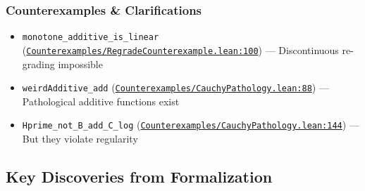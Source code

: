 \documentclass[11pt]{article}
\theoremstyle{definition}
\theoremstyle{remark}
\begin{document}
\subsubsection*{Counterexamples \& Clarifications}
\begin{itemize}
\item \texttt{monotone\_additive\_is\_linear} (\href{https://github.com/zariuq/ks-foundations-of-inference/blob/main/KnuthSkilling/Counterexamples/RegradeCounterexample.lean\#L100}{\texttt{Counterexamples/RegradeCounterexample.lean:100}}) --- Discontinuous re-grading impossible
\item \texttt{weirdAdditive\_add} (\href{https://github.com/zariuq/ks-foundations-of-inference/blob/main/KnuthSkilling/Counterexamples/CauchyPathology.lean\#L88}{\texttt{Counterexamples/CauchyPathology.lean:88}}) --- Pathological additive functions exist
\item \texttt{Hprime\_not\_B\_add\_C\_log} (\href{https://github.com/zariuq/ks-foundations-of-inference/blob/main/KnuthSkilling/Counterexamples/CauchyPathology.lean\#L144}{\texttt{Counterexamples/CauchyPathology.lean:144}}) --- But they violate regularity
\end{itemize}

\subsection{Key Discoveries from Formalization}
\end{document}
